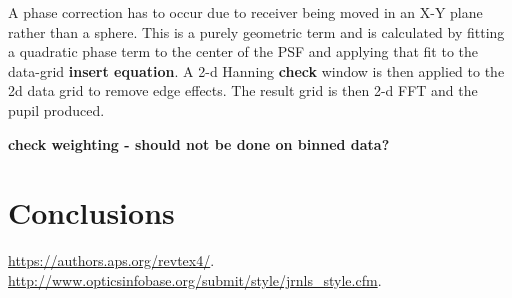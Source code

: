 \documentclass[osajnl,twocolumn,showpacs,superscriptaddress,11pt]{revtex4-1} %
\begin{document}
A phase correction has to occur due to receiver being moved in an X-Y plane rather than a sphere.  This is a purely geometric term and is calculated by fitting a quadratic phase term to the center of the PSF and applying that fit to the data-grid {\bf insert equation}. A 2-d Hanning {\bf check} window is then applied to the 2d data grid to remove edge effects.  The result grid is then 2-d FFT and the pupil produced. 



{\bf check weighting - should not be done on binned data?}

\section{Conclusions}

\begin{thebibliography}{99}

 \url{https://authors.aps.org/revtex4/}.
 \url{http://www.opticsinfobase.org/submit/style/jrnls_style.cfm}.

\end{thebibliography}
\end{document}
